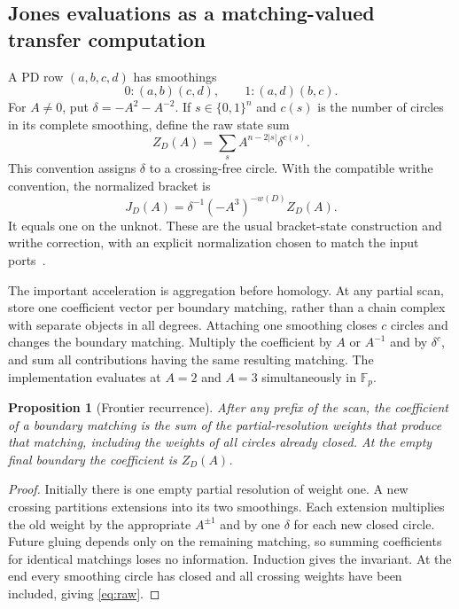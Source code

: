 \documentclass[11pt,letterpaper]{article}
\newtheorem{proposition}[theorem]{Proposition}
\theoremstyle{definition}\newtheorem{definition}[theorem]{Definition}
\theoremstyle{remark}\newtheorem{remark}[theorem]{Remark}
\newcommand{\F}{\mathbb F}
\begin{document}
\subsection{Jones evaluations as a matching-valued transfer computation}

A PD row $(a,b,c,d)$ has smoothings
\[
 0:(a,b)(c,d),\qquad 1:(a,d)(b,c).
\]
For $A\ne0$, put $\delta=-A^2-A^{-2}$. If $s\in\{0,1\}^n$ and $c(s)$ is the
number of circles in its complete smoothing, define the raw state sum
\begin{equation}\label{eq:raw}
 Z_D(A)=\sum_s A^{n-2|s|}\delta^{c(s)}.
\end{equation}
This convention assigns $\delta$ to a crossing-free circle. With the compatible
writhe convention, the normalized bracket is
\begin{equation}\label{eq:normalized}
 J_D(A)=\delta^{-1}(-A^3)^{-w(D)}Z_D(A).
\end{equation}
It equals one on the unknot. These are the usual bracket-state construction and
writhe correction, with an explicit normalization chosen to match the input
ports~\cite{kauffman}.

The important acceleration is aggregation before homology. At any partial scan,
store one coefficient vector per boundary matching, rather than a chain complex
with separate objects in all degrees. Attaching one smoothing closes $c$ circles
and changes the boundary matching. Multiply the coefficient by $A$ or $A^{-1}$
and by $\delta^c$, and sum all contributions having the same resulting matching.
The implementation evaluates at $A=2$ and $A=3$ simultaneously in $\F_p$.

\begin{proposition}[Frontier recurrence]
After any prefix of the scan, the coefficient of a boundary matching is the sum
of the partial-resolution weights that produce that matching, including the
weights of all circles already closed. At the empty final boundary the
coefficient is $Z_D(A)$.
\end{proposition}
\begin{proof}
Initially there is one empty partial resolution of weight one. A new crossing
partitions extensions into its two smoothings. Each extension multiplies the
old weight by the appropriate $A^{\pm1}$ and by one $\delta$ for each new closed
circle. Future gluing depends only on the remaining matching, so summing
coefficients for identical matchings loses no information. Induction gives the
invariant. At the end every smoothing circle has closed and all crossing weights
have been included, giving \eqref{eq:raw}.
\end{proof}
\end{document}
